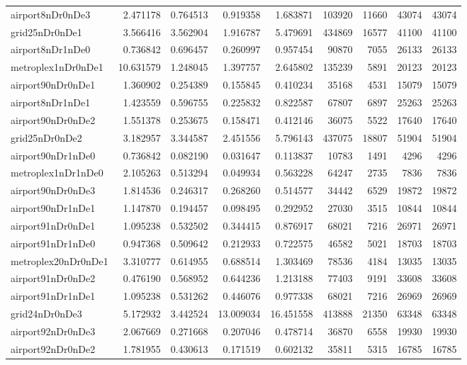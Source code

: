 \begin{longtable}{|l|r|r|r|r|r|r|r|r|}
airport8nDr0nDe3 & 2.471178 & 0.764513 & 0.919358 & 1.683871 & 103920 & 11660 & 43074 & 43074 \\
grid25nDr0nDe1 & 3.566416 & 3.562904 & 1.916787 & 5.479691 & 434869 & 16577 & 41100 & 41100 \\
airport8nDr1nDe0 & 0.736842 & 0.696457 & 0.260997 & 0.957454 & 90870 & 7055 & 26133 & 26133 \\
metroplex1nDr0nDe1 & 10.631579 & 1.248045 & 1.397757 & 2.645802 & 135239 & 5891 & 20123 & 20123 \\
airport90nDr0nDe1 & 1.360902 & 0.254389 & 0.155845 & 0.410234 & 35168 & 4531 & 15079 & 15079 \\
airport8nDr1nDe1 & 1.423559 & 0.596755 & 0.225832 & 0.822587 & 67807 & 6897 & 25263 & 25263 \\
airport90nDr0nDe2 & 1.551378 & 0.253675 & 0.158471 & 0.412146 & 36075 & 5522 & 17640 & 17640 \\
grid25nDr0nDe2 & 3.182957 & 3.344587 & 2.451556 & 5.796143 & 437075 & 18807 & 51904 & 51904 \\
airport90nDr1nDe0 & 0.736842 & 0.082190 & 0.031647 & 0.113837 & 10783 & 1491 & 4296 & 4296 \\
metroplex1nDr1nDe0 & 2.105263 & 0.513294 & 0.049934 & 0.563228 & 64247 & 2735 & 7836 & 7836 \\
airport90nDr0nDe3 & 1.814536 & 0.246317 & 0.268260 & 0.514577 & 34442 & 6529 & 19872 & 19872 \\
airport90nDr1nDe1 & 1.147870 & 0.194457 & 0.098495 & 0.292952 & 27030 & 3515 & 10844 & 10844 \\
airport91nDr0nDe1 & 1.095238 & 0.532502 & 0.344415 & 0.876917 & 68021 & 7216 & 26971 & 26971 \\
airport91nDr1nDe0 & 0.947368 & 0.509642 & 0.212933 & 0.722575 & 46582 & 5021 & 18703 & 18703 \\
metroplex20nDr0nDe1 & 3.310777 & 0.614955 & 0.688514 & 1.303469 & 78536 & 4184 & 13035 & 13035 \\
airport91nDr0nDe2 & 0.476190 & 0.568952 & 0.644236 & 1.213188 & 77403 & 9191 & 33608 & 33608 \\
airport91nDr1nDe1 & 1.095238 & 0.531262 & 0.446076 & 0.977338 & 68021 & 7216 & 26969 & 26969 \\
grid24nDr0nDe3 & 5.172932 & 3.442524 & 13.009034 & 16.451558 & 413888 & 21350 & 63348 & 63348 \\
airport92nDr0nDe3 & 2.067669 & 0.271668 & 0.207046 & 0.478714 & 36870 & 6558 & 19930 & 19930 \\
airport92nDr0nDe2 & 1.781955 & 0.430613 & 0.171519 & 0.602132 & 35811 & 5315 & 16785 & 16785 \\

\end{longtable}
